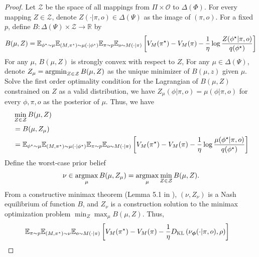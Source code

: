 \begin{proof}
Let $\mathcal{Z}$ be the space of all mappings from $\Pi \times \mathcal{O}$ to $\Delta(\Phi)$. For every mapping $Z \in \mathcal{Z}$, denote $Z(\cdot|\pi, o) \in \Delta(\Psi)
$ as the image of $(\pi, o)$. For a fixed $p$, define $B: \Delta(\Psi) \times \mathcal{Z} \rightarrow \mathbb{R}$ by
\begin{align*}
    B(\mu, Z) = \mathbb{E}_{\phi^\star \sim \mu}\mathbb{E}_{(M, \pi^\star) \sim \mu(\cdot|\phi^\star)}\mathbb{E}_{\pi \sim p}\mathbb{E}_{o \sim M(\cdot|\pi)}\left[V_M(\pi^\star) - V_M(\pi) - \frac{1}{\eta}\log\frac{Z(\phi^\star|\pi, o)}{q(\phi^\star)}\right]
\end{align*}
For any $\mu$, $B(\mu, Z)$ is strongly convex with respect to $Z$, For any $\mu \in \Delta(\Psi)$, denote $Z_\mu = \operatorname*{argmin}_{Z \in \mathcal{Z}}  B(\mu, Z)$ as the unique minimizer of $B(\mu, z)$ given $\mu$. Solve the first order optimality condition for the Lagrangian of $B(\mu, Z)$ constrained on $Z$ as a valid distribution, we have $Z_{\mu}(\phi|\pi, o) = \mu(\phi|\pi, o)$ for every $\phi, \pi, o$ as the posterior of $\mu$. Thus, we have
\begin{align*} 
    &\min_{Z \in \mathcal{Z}} B(\mu, Z)
    \\&=  B(\mu, Z_{\mu})
    \\&= \mathbb{E}_{\phi^\star \sim \mu}\mathbb{E}_{(M, \pi^\star) \sim \mu(\cdot|\phi^\star)}\mathbb{E}_{\pi \sim p}\mathbb{E}_{o \sim M(\cdot|\pi)}\left[V_M(\pi^\star) - V_M(\pi) - \frac{1}{\eta}\log\frac{\mu(\phi^\star|\pi, o)}{q(\phi^\star)}\right]
\end{align*}
Define the worst-case prior belief 
\begin{align*}
    \nu \in \operatorname*{argmax}_{\mu} B(\mu, Z_{\mu}) = \operatorname*{argmax}_{\mu} \min_{Z \in \mathcal{Z}} B(\mu, Z).
\end{align*}
From a constructive minimax theorem (Lemma 5.1 in \cite{xu2023bayesian}), $(\nu, Z_{\nu})$ is a Nash equilibrium of function $B$, and $Z_{\nu}$ is a construction solution to the minimax optimization problem $\min_{Z}\max_{\mu}B(\mu, Z)$. Thus,
\begin{align*}
&\E_{\pi\sim p} \E_{(M,\pi^\star)\sim \nu} \E_{o\sim M(\cdot|\pi)}\left[ V_{M}(\pi^\star) -  V_{M}(\pi) - \frac{1}{\eta} \KL\left( \nu_{\bo{\phi}}(\cdot|\pi, o), \rho\right) \right]

\end{align*}
\end{proof}
